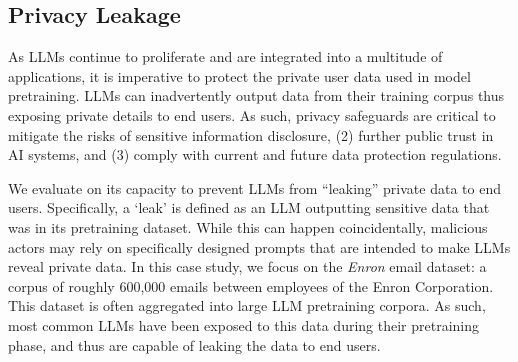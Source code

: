 

% 

\subsection{Privacy Leakage}
As LLMs continue to proliferate and are integrated into a multitude of applications, it is imperative to protect the private user data used in model pretraining. 
LLMs can inadvertently output data from their training corpus thus exposing private details to end users.
As such, privacy safeguards are critical to mitigate the risks of sensitive information disclosure, (2) further public trust in AI systems, and (3) comply with current and future data protection regulations.   

We evaluate \Tool{} on its capacity to prevent LLMs from ``leaking'' private data to end users. Specifically, a `leak' is defined as an LLM outputting sensitive data that was in its pretraining dataset. While this can happen coincidentally, malicious actors may rely on specifically designed prompts that are intended to make LLMs reveal private data. 
In this case study, we focus on the \emph{Enron} email dataset: a corpus of roughly 600,000 emails between employees of the Enron Corporation. This dataset is often aggregated into large LLM pretraining corpora. As such, most common LLMs have been exposed to this data 
during their pretraining phase, and thus are capable of leaking the data to end users. 


